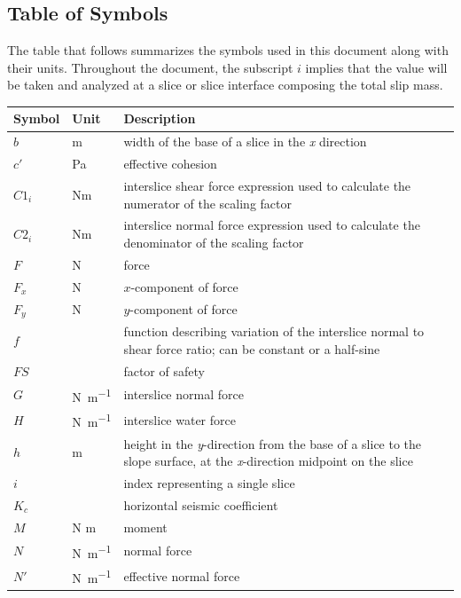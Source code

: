\documentclass[12pt]{article}
\renewcommand{\arraystretch}{1}
\begin{document}
\subsection{Table of Symbols}


The table that follows summarizes the symbols used in this document along with 
their units. 
Throughout the document, the subscript $i$ implies that the value will be taken 
and analyzed at a slice or slice interface composing the total slip mass.

\renewcommand{\arraystretch}{1.6}
\setlength{\tabcolsep}{20pt}
\begin{longtable*}{  l  l  p{8.5cm}  }
\hline
\textbf{Symbol} & \textbf{Unit} & \textbf{Description} \\
\hline
$b$ & \si{\meter}& width of the base of a slice in the \textit{x} direction
\\
$c'$ & \si{\pascal} & effective cohesion 
\\
${C1_{i}}$ &  N\si{\meter}& interslice shear force expression used to calculate 
the numerator of the scaling factor
\\
${C2_{i}}$ &  N\si{\meter}& interslice normal force expression used to 
calculate the denominator of the scaling factor
\\
$F$ &\si{\newton} & force
\\
${F_{x}}$ & \si{\newton} &$x$-component of force
\\
${F_{y}}$ & \si{\newton} &$y$-component of force
\\
$f$ & & function describing variation of the interslice normal to shear force 
ratio; can be constant or a half-sine
\\
$FS$ & & factor of safety
\\
$G$ & \si{\newton\per\meter} & interslice normal force
\\
$H$ & \si{\newton\per\meter} & interslice water force
\\
$h$ &  \si{\meter}& height in the \textit{y}-direction from the base of a slice 
to the slope surface, at the \textit{x}-direction midpoint on the slice
\\
$i$ & & index representing a single slice 
\\
${K_{c}}$ & & horizontal seismic coefficient
\\
$M$ & N \si{\meter}& moment
\\
$N$ & \si{\newton\per\meter} & normal force
\\
$N'$ &\si{\newton\per\meter} & effective normal force
\\

\end{longtable*}
\end{document}
